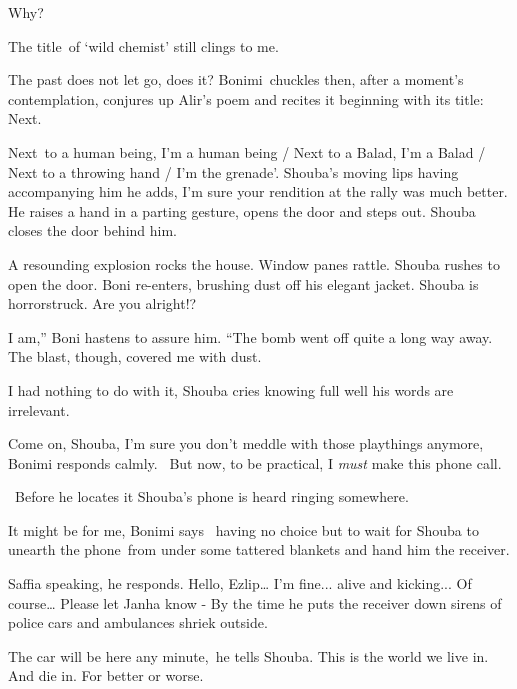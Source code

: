 \documentclass[12pt]{book}
\begin{document}
{\textquotedbl}Why?{\textquotedbl}

{\textquotedbl}The title~of `wild chemist' still clings to me.{\textquotedbl}

{\textquotedbl}The past does not let go, does it?{\textquotedbl} Bonimi~chuckles then, after a moment's contemplation,
conjures up Alir's poem and recites it beginning with its title: {\textquotedbl}Next.

Next~to a human being, I'm a human being / Next to a Balad, I'm a Balad / Next to a throwing hand / I'm the
grenade'.{\textquotedbl} Shouba's moving lips having accompanying him he adds, {\textquotedbl}I'm sure your rendition
at the rally was much better.{\textquotedbl} He raises a hand in a parting gesture, opens the door and steps out.
Shouba closes the door behind him.

A resounding explosion rocks the house. Window panes rattle. Shouba rushes to open the door. Boni re-enters, brushing
dust off his elegant jacket. Shouba is horrorstruck. {\textquotedbl}Are you alright!?{\textquotedbl}

{\textquotedbl}I am,'' Boni hastens to assure him. ``The bomb went off quite a long way away. The blast, though, covered
me with dust.{\textquotedbl}

{\textquotedbl}I had nothing to do with it,{\textquotedbl} Shouba cries knowing full well his words are irrelevant.

{\textquotedbl}Come on, Shouba, I'm sure you don't meddle with those playthings anymore,{\textquotedbl} Bonimi responds
calmly. \ {\textquotedbl}But now, to be practical, I \textit{must }make this phone call.{\textquotedbl}

\ Before he locates it Shouba's phone is heard ringing somewhere.

{\textquotedbl}It might be for me,{\textquotedbl} Bonimi says \ having no choice but to wait for Shouba to unearth the
phone~from under some tattered{ }blankets and hand him the receiver.

{\textquotedbl}Saffia speaking,{\textquotedbl} he responds. {\textquotedbl}Hello, Ezlip{\dots} I'm fine... alive and
kicking... Of course{\dots} Please let Janha know -{\textquotedbl} By the time he puts the receiver down sirens of
police cars and ambulances shriek outside.

{\textquotedbl}The car will be here any minute,{\textquotedbl}~he tells Shouba. {\textquotedbl}This is the world we live
in. And die in. For better or worse.{\textquotedbl}


\bigskip
\end{document}
